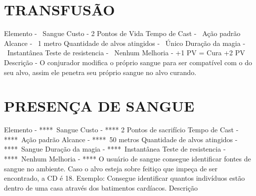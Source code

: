 \documentclass{article}%
\begin{document}
%
\normalsize%
\section{TRANSFUSÃO}%
\label{sec:TRANSFUSO}%
Elemento {-} ~Sangue\newline%
Custo {-}  2 Pontos de Vida\newline%
Tempo de Cast {-} ~Ação padrão\newline%
Alcance {-} ~1 metro\newline%
Quantidade de alvos atingidos {-} ~Único\newline%
Duração da magia {-} ~Instantânea\newline%
Teste de resistencia {-} ~Nenhum\newline%
Melhoria {-}  +1 PV = Cura +2 PV\newline%
Descrição {-}  O conjurador modifica o próprio sangue para ser compatível com o do seu alvo, assim ele penetra seu próprio sangue no alvo curando.\newline%

%
\section{PRESENÇA DE SANGUE}%
\label{sec:PRESENADESANGUE}%
Elemento {-} ****~Sangue\newline%
Custo {-} **** 2 Pontos de sacrifício\newline%
Tempo de Cast {-} ****~Ação padrão\newline%
Alcance {-} ****~50 metros\newline%
Quantidade de alvos atingidos {-} ****~Sangue\newline%
Duração da magia {-} ****~Instantânea\newline%
Teste de resistencia {-} ****~Nenhum\newline%
Melhoria {-} **** O usuário de sangue consegue identificar fontes de sangue no ambiente. Caso o alvo esteja sobre feitiço que impeça de ser encontrado, a CD é 18. Exemplo: Consegue identificar quantos indivíduos estão dentro de uma casa através dos batimentos cardíacos.\newline%
Descrição \newline%

%
\end{document}
